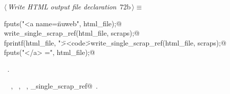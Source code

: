 \documentclass[a4paper]{report}
\begin{document}
\begin{flushleft} \small
\begin{minipage}{\linewidth}\label{scrap141}\raggedright\small
{} $\langle\,${\it Write HTML output file declaration}\nobreak\ {\footnotesize {72b}}$\,\rangle\equiv$
\vspace{-1ex}
\begin{list}{}{} \item
\mbox{}\verb@  fputs("<a name=\"nuweb", html_file);@\\
\mbox{}\verb@  write_single_scrap_ref(html_file, scraps);@\\
\mbox{}\verb@  fprintf(html_file, "\"><code>\"%s\"</code> ", name->spelling);@\\
\mbox{}\verb@  write_single_scrap_ref(html_file, scraps);@\\
\mbox{}\verb@  fputs("</a> =\n", html_file);@\\
\mbox{}\verb@@{\NWsep}
\end{list}
\vspace{-1.5ex}
\footnotesize
\begin{list}{}{\setlength{\itemsep}{-\parsep}\setlength{\itemindent}{-\leftmargin}}
\item \NWtxtMacroRefIn\ .
\item \NWtxtIdentsUsed\nobreak\  \verb@fprintf@\nobreak\ , \verb@fputs@\nobreak\ , \verb@scraps@\nobreak\ , \verb@write_single_scrap_ref@\nobreak\ .
\item{}
\end{list}
\end{minipage}\vspace{4ex}
\end{flushleft}
\end{document}

